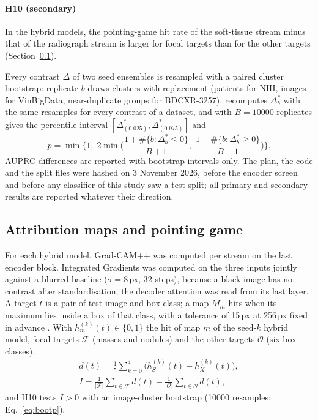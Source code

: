 \paragraph{H10 (secondary)} In the hybrid models, the pointing-game hit rate of the soft-tissue stream minus that of the radiograph stream is
larger for focal targets than for the other targets (Section~\ref{sec:cls_xai}).

Every contrast $\Delta$ of two seed ensembles is resampled with a paired cluster bootstrap: replicate $b$ draws clusters with replacement
(patients for NIH, images for VinBigData, near-duplicate groups for BDCXR-3257), recomputes $\Delta^{*}_b$ with the same resamples for every
contrast of a dataset, and with $B=\num{10000}$ replicates gives the percentile interval $[\Delta^{*}_{(0.025)},\Delta^{*}_{(0.975)}]$ and
\begin{equation}
p=\min\Big\{1,\;2\min\Big(\frac{1+\#\{b:\Delta^{*}_b\le0\}}{B+1},\;\frac{1+\#\{b:\Delta^{*}_b\ge0\}}{B+1}\Big)\Big\}.
\label{eq:bootp}
\end{equation}
AUPRC differences are reported with bootstrap intervals only. The plan, the code and the split files were hashed on 3 November 2026, before
the encoder screen and before any classifier of this study saw a test split; all primary and secondary results are reported whatever their
direction.

\subsection{Attribution maps and pointing game}
\label{sec:cls_xai}
For each hybrid model, Grad-CAM++ \citep{chattopadhay2018gradcampp} was computed per stream on the last encoder block. Integrated Gradients
\citep{sundararajan2017axiomatic} was computed on the three inputs jointly against a blurred baseline ($\sigma=8$\,px, 32 steps), because a
black image has no contrast after standardisation; the decoder attention was read from its last layer. A target $t$ is a pair of test image
and box class; a map $M_m$ hits when its maximum lies inside a box of that class, with a tolerance of 15\,px at 256\,px fixed in advance
\citep{zhang2018topdown}. With $h^{(k)}_m(t)\in\{0,1\}$ the hit of map $m$ of the seed-$k$ hybrid model, focal targets $\mathcal{F}$ (masses
and nodules) and the other targets $\mathcal{O}$ (six box classes),
\begin{equation}
\begin{gathered}
d(t)=\frac15\sum_{k=0}^{4}\big(h^{(k)}_{S}(t)-h^{(k)}_{X}(t)\big),\\
I=\frac{1}{|\mathcal{F}|}\sum_{t\in\mathcal{F}}d(t)-\frac{1}{|\mathcal{O}|}\sum_{t\in\mathcal{O}}d(t),
\end{gathered}
\label{eq:pointing}
\end{equation}
and H10 tests $I>0$ with an image-cluster bootstrap (\num{10000} resamples; Eq.~\eqref{eq:bootp}).

